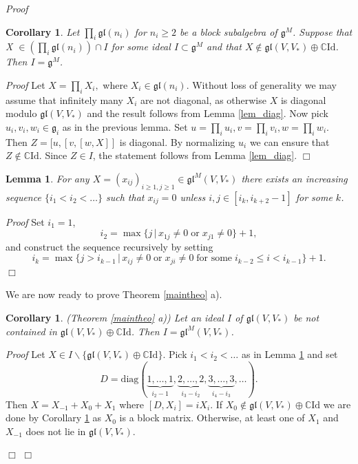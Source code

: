\documentclass[10pt]{amsart}
\newcounter{theorem}
\newtheorem{lemma}[theo]{Lemma}
\newtheorem{corollary}[theo]{Corollary}
\renewenvironment{proof}{ \emph{Proof}}{$\Box$}
\newcommand {\CC} {\mathbb {C}}
\newcommand{\oj}{\mathfrak{g}}
\newcommand{\ojl}{\mathfrak{gl}}
\newcommand{\id}{\mathrm{Id}}
\renewcommand{\gg}{\mathfrak{g}}
\newcommand{\gl}{\mathfrak{gl}}
\begin{document}
\begin{proof}
\begin{corollary}\label{cor_1} Let $\prod_{i} \gl(n_i)$ for $n_i \geq 2$ be a block subalgebra of $\gg^M$. 
Suppose that X $\in \left(\prod_{i} \gl(n_i)\right) \cap I$ for some ideal $I \subset \gg^M$ and that $X \notin \gl(V,V_*) \oplus \CC \mathrm{Id}$. Then $I = \gg^M$.
\end{corollary}
\begin{proof}
 Let $X = \prod_i X_i,$ where $X_i \in \gl(n_i)$. Without loss of generality we may assume that infinitely many $X_i$ are not diagonal, as otherwise $X$ is diagonal modulo $\gl(V,V_*)$ and the result follows from Lemma \ref{lem_diag}. Now pick $u_i,v_i,w_i \in \oj_i$ as in the previous lemma. Set $u = \prod_i u_i, v=\prod_i v_i, w=\prod_i w_i$. Then $Z=[u,[v,[w,X]]$ is diagonal. By normalizing $u_i$ we can ensure that $Z \notin \CC \id$. Since $Z \in I$, the statement follows from Lemma \ref{lem_diag}.
\end{proof}

\begin{lemma}\label{lem_4} 
For any $X = (x_{ij})_{i\geq1,j\geq1}\in \gl^M(V,V_*)$ there exists an increasing sequence $\lbrace i_1<i_2<\dots\rbrace$ such that 
$x_{ij}=0$ unless $i,j \in \left[i_k,i_{k+2}-1\right]$ for some $k$. 
\end{lemma}


\begin{proof} Set $i_1 =1$,
 \begin{equation}
  i_2 = \max\lbrace j\,|\, x_{1j}\neq0\; \mbox{or}\; x_{j1}\neq0\rbrace+1, \nonumber 
 \end{equation}
and construct the sequence recursively by setting 
\begin{equation}
 i_k = \max \lbrace j > i_{k-1}\,|\, x_{ij} \neq0\; \mbox{or}\; x_{ji} \neq0 \;\mbox{for some}\; i_{k-2} \leq i < i_{k-1}\rbrace +1.\nonumber
\end{equation}
\end{proof}

We are now ready to prove Theorem \ref{maintheo} a).

\begin{corollary}\label{cor_2}(Theorem \ref{maintheo} a))  
Let an ideal $I$ of $ \gl(V,V_*)$ be not contained in $\gl (V,V_*) \oplus \CC \id$. Then $I=\gl^M(V,V_*)$.
\end{corollary}

\begin{proof}
 Let $X \in I \backslash \lbrace\ojl(V,V_*) \oplus \CC \mathrm{Id}\rbrace$. Pick $i_1 < i_2 < \dots$ as in Lemma \ref{lem_4} and set 
\begin{equation}
 D = \mathrm{diag} (\underbrace{1, \dots, 1}_{i_2-1}, \underbrace{2, \dots ,2}_{i_3-i_2}, \underbrace{3, \dots, 3}_{i_4-i_3}, \dots). \nonumber
\end{equation}
 Then $X=X_{-1}+X_0+X_1$ where $[D,X_i]=iX_i$. If $X_0 \notin \ojl(V,V_*) \oplus \CC \id$ we are done by Corollary \ref{cor_1} as $X_0$ is a block matrix. Otherwise, at least one of $X_1$ and $X_{-1}$ does not lie in $\ojl(V,V_*)$.


\end{proof}
\end{proof}
\end{document}
